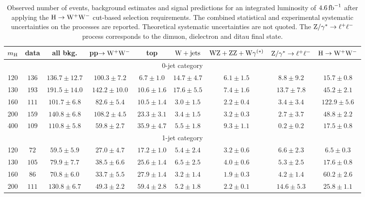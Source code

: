\documentclass[12pt,twoside,a4paper,cmspaper,final,collab]{cms-tdr}
\begin{document}
\begin{table}[htbp]
  \begin{center}
  \caption{Observed number of events, background estimates and signal predictions
  for an integrated luminosity of $4.6\mbox{\ensuremath{\,\text{fb}^\text{$-$1}}}$ after applying the $\mathrm{H}\to\mathrm{W^+}{}\mathrm{W^-}$ cut-based selection requirements.
  The combined statistical and experimental systematic uncertainties on the processes are reported.
  Theoretical systematic uncertainties are not quoted.
  The $\mathrm{Z}/\gamma^*\to \ell^+\ell^-$ process corresponds to the dimuon, dielectron and ditau final state.}
   \label{tab:hwwselection}
 {
\setlength{\extrarowheight}{1pt}
\begin{tabular} {|c|c|c|c|c|c|c|c|c|}
  \hline
$m_{\mathrm{H}}$ & data & all bkg. & pp$\to \mathrm{W^+}{}\mathrm{W^-}$ & top & $\mathrm{W}+\mathrm{jets}$ & $\mathrm{W}\mathrm{Z}+\mathrm{Z}\mathrm{Z}+\mathrm{W}\gamma^{(*)}$ & $\mathrm{Z}/\gamma^*\to \ell^+\ell^-$ & $\mathrm{H} \to \mathrm{W^+}{}\mathrm{W^-}$ \\ \hline
\multicolumn{9}{|c|}{0-jet category} \\
  \hline
120 & $136$ & $136.7\pm12.7$ & $100.3\pm7.2$  & $6.7\pm1.0$  & $14.7\pm4.7$ & $6.1\pm1.5$ & $8.8\pm9.2$  & $15.7\pm0.8$  \\ \hline
130 & $193$ & $191.5\pm14.0$ & $142.2\pm10.0$ & $10.6\pm1.6$ & $17.6\pm5.5$ & $7.4\pm1.6$ & $13.7\pm7.8$ & $45.2\pm2.1$  \\ \hline
160 & $111$ & $101.7\pm6.8$  & $82.6\pm5.4$   & $10.5\pm1.4$ & $3.0\pm1.5$  & $2.2\pm0.4$ & $3.4\pm3.4$  & $122.9\pm5.6$ \\ \hline
200 & $159$ & $140.8\pm6.8$  & $108.2\pm4.5$  & $23.3\pm3.1$ & $3.4\pm1.5$  & $3.2\pm0.3$ & $2.7\pm3.7$  & $48.8\pm2.2$  \\ \hline
400 & $109$ & $110.8\pm5.8$  & $59.8\pm2.7$   & $35.9\pm4.7$ & $5.5\pm1.8$  & $9.3\pm1.1$ & $0.2\pm0.2$  & $17.5\pm0.8$  \\ \hline
\multicolumn{9}{|c|}{1-jet category} \\
\hline
120 & $72$  & $59.5\pm5.9$   & $27.0\pm4.7$   & $17.2\pm1.0$ & $5.4\pm2.4$  & $3.2\pm0.6$ & $6.6\pm2.3$  & $6.5\pm0.3$  \\ \hline
130 & $105$ & $79.9\pm7.7$   & $38.5\pm6.6$   & $25.6\pm1.4$ & $6.5\pm2.5$  & $4.0\pm0.6$ & $5.3\pm2.5$  & $17.6\pm0.8$ \\ \hline
160 & $86$  & $70.8\pm6.0$   & $33.7\pm5.5$   & $27.9\pm1.4$ & $3.2\pm1.4$  & $1.9\pm0.3$ & $4.2\pm1.4$  & $60.2\pm2.6$ \\ \hline
200 & $111$ & $130.8\pm6.7$  & $49.3\pm2.2$   & $59.4\pm2.8$ & $5.2\pm1.8$  & $2.2\pm0.1$ & $14.6\pm5.3$ & $25.8\pm1.1$ \\ \hline

\end{tabular}}
\end{center}
\end{table}
\end{document}
